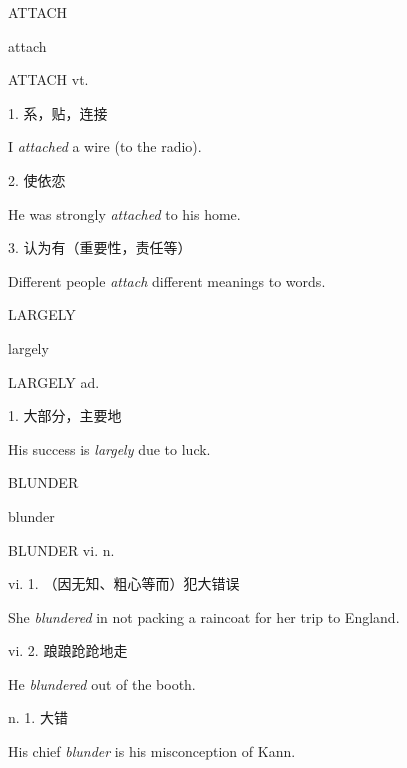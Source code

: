 \begin{flashcard}{
ATTACH

attach
}
\begin{center}
ATTACH vt. 
\end{center}
1. 系，贴，连接

I \textit{attached} a wire (to the radio).

2. 使依恋

He was strongly \textit{attached} to his home.

3. 认为有（重要性，责任等）

Different people \textit{attach} different meanings to words.

\end{flashcard}
\begin{flashcard}{
LARGELY

largely
}
\begin{center}
LARGELY ad. 
\end{center}
1. 大部分，主要地

His success is \textit{largely} due to luck.

\end{flashcard}
\begin{flashcard}{
BLUNDER

blunder
}
\begin{center}
BLUNDER vi. n. 
\end{center}
vi. 1. （因无知、粗心等而）犯大错误

She \textit{blundered} in not packing a raincoat for her trip to England.

vi. 2. 踉踉跄跄地走

He \textit{blundered} out of the booth.

n. 1. 大错

His chief \textit{blunder} is his misconception of Kann.

\end{flashcard}
